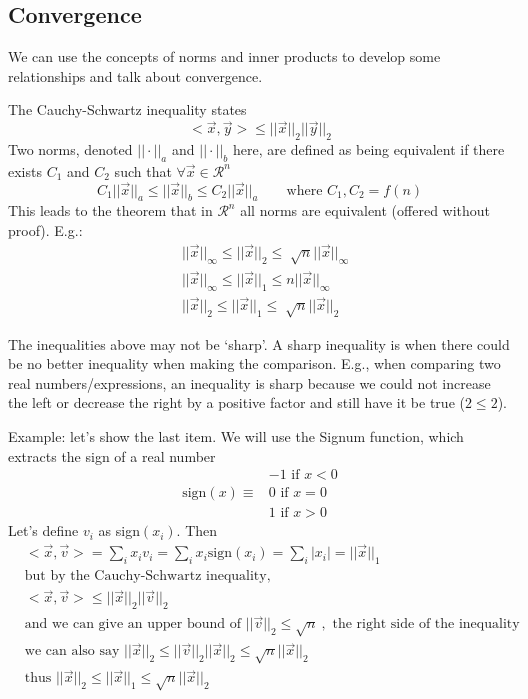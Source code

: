\documentclass[12pt]{article}
\begin{document}
\subsection{Convergence}
We can use the concepts of norms and inner products to develop some relationships and talk about convergence. 

The Cauchy-Schwartz inequality states
%
\begin{equation}
< \vec{x}, \vec{y} > \leq ||\vec{x}||_2 ||\vec{y}||_2 \nonumber
\end{equation}
%
Two norms, denoted $|| \cdot ||_a$ and $|| \cdot ||_b$ here, are defined as being equivalent if there exists $C_1$ and $C_2$ such that $\forall \vec{x} \in \mathcal{R}^n$
%
\begin{equation}
C_1 ||\vec{x}||_a \leq ||\vec{x}||_b \leq C_2 ||\vec{x}||_a \qquad \text{where } C_1, C_2 = f(n) \nonumber
\end{equation}
%
This leads to the theorem that in $\mathcal{R}^n$ all norms are equivalent (offered without proof). E.g.:
\begin{align}
& ||\vec{x}||_{\infty} \leq ||\vec{x}||_2 \leq \sqrt[]{n} ||\vec{x}||_{\infty} \nonumber \\
%
& ||\vec{x}||_{\infty} \leq ||\vec{x}||_1 \leq n ||\vec{x}||_{\infty} \nonumber \\
%
& ||\vec{x}||_2 \leq ||\vec{x}||_1 \leq \sqrt[]{n} ||\vec{x}||_2 \nonumber
\end{align}

The inequalities above may not be `sharp'. A sharp inequality is when there could be no better inequality when making the comparison. E.g., when comparing two real numbers/expressions, an inequality is sharp because we could not increase the left or decrease the right by a positive factor and still have it be true ($2 \leq 2$). 

Example: let's show the last item. We will use the Signum function, which extracts the sign of a real number
\begin{align}
              & -1 \text{ if } x < 0 \nonumber \\
\text{sign}(x) \equiv &  0 \text{ if } x = 0 \nonumber \\
              &  1 \text{ if } x > 0 \nonumber
\end{align}
%
Let's define $v_i$ as sign$(x_i)$. Then
%
\begin{align}
&< \vec{x}, \vec{v} > = \sum_i x_i v_i = \sum_i x_i \text{sign}(x_i) = \sum_i |x_i| = ||\vec{x}||_1 \nonumber \\
%
&\text{but by the Cauchy-Schwartz inequality,}\nonumber \\
%
&< \vec{x}, \vec{v} > \leq ||\vec{x}||_2 ||\vec{v}||_2 \nonumber \\
%
&\text{and we can give an upper bound of } ||\vec{v}||_2 \leq \sqrt{n} \:, \text{ the right side of the inequality} \nonumber \\ 
%
&\text{we can also say } ||\vec{x}||_2 \leq ||\vec{v}||_2 ||\vec{x}||_2 \leq \sqrt{n} ||\vec{x}||_2 \nonumber \\
%
&\text{thus } ||\vec{x}||_2 \leq ||\vec{x}||_1 \leq \sqrt{n} ||\vec{x}||_2 \nonumber
\end{align}
\end{document}
